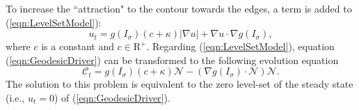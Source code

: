 To increase the ``attraction" to the contour towards the edges, a term is added to (\ref{eqn:LevelSetModel}):
\begin{equation}
\label{eqn:GeodesicDriver}
u_t = g( I_{\sigma} )( c + \kappa ) |\nabla u| + \nabla u \cdot \nabla g(I_{\sigma}),
\end{equation}
where $c$ is a constant and $c \in \mathrm{R}^+$.
Regarding (\ref{eqn:LevelSetModel}), %
equation (\ref{eqn:GeodesicDriver}) can be transformed to the following evolution equation
\begin{equation}
\label{eqn:GeodesicEvolution}
\mathcal{C}_t = g(I_{\sigma}) ( c + \kappa ) \mathcal{N} - ( \nabla g(I_{\sigma}) \cdot \mathcal{N} ) \mathcal{N}.
\end{equation}
The solution to this problem is equivalent to the zero level-set of the steady state (i.e., $u_t = 0$) of (\ref{eqn:GeodesicDriver}).

%
